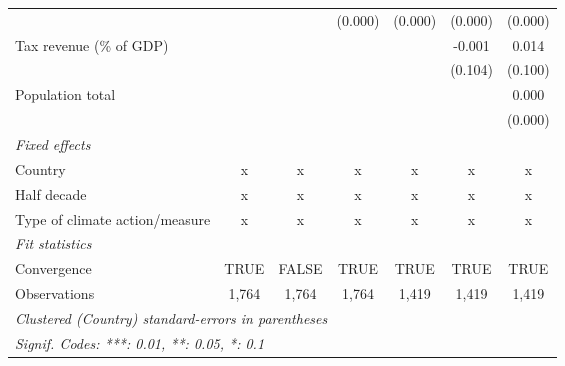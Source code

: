 \begin{tabular}{lcccccc}
                                                                                    &              &                 & (0.000)       & (0.000)       & (0.000)       & (0.000)\\   
   Tax revenue (\% of GDP)                                                          &              &                 &               &               & -0.001        & 0.014\\   
                                                                                    &              &                 &               &               & (0.104)       & (0.100)\\   
   Population total                                                                 &              &                 &               &               &               & 0.000\\   
                                                                                    &              &                 &               &               &               & (0.000)\\   
   \emph{Fixed effects}\\
   Country                                                                          & x            & x               & x             & x             & x             & x\\  
   Half decade                                                                      & x            & x               & x             & x             & x             & x\\  
   Type of climate action/measure                                                   & x            & x               & x             & x             & x             & x\\  
   \midrule \emph{Fit statistics}\\
   Convergence                                                                      &TRUE          & FALSE           & TRUE          & TRUE          & TRUE          & TRUE\\  
   Observations                                                                     & 1,764        & 1,764           & 1,764         & 1,419         & 1,419         & 1,419\\  
   \midrule
   \multicolumn{7}{l}{\emph{Clustered (Country) standard-errors in parentheses}}\\
   \multicolumn{7}{l}{\emph{Signif. Codes: ***: 0.01, **: 0.05, *: 0.1}}\\
\end{tabular}
\par\endgroup


